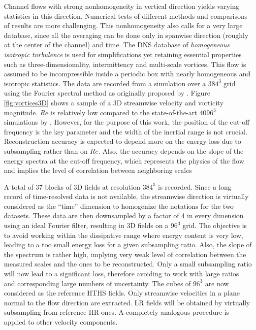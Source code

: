 Channel flows with strong nonhomogeneity in vertical direction yields varying statistics in this direction. Numerical tests of different methods and comparisons of results are more challenging. This nonhomogeneity also calls for a very large database, since all the averaging can be done only in spanwise direction (roughly at the center of the channel) and time. The DNS database of \textit{homogeneous isotropic turbulence} is used for simplifications yet retaining essential properties such as three-dimensionality, intermittency and multi-scale vortices. This flow is assumed to be incompressible inside a periodic box with nearly homogeneous and isotropic statistics. The data are recorded from a simulation over a $ 384^3 $ grid using the Fourier spectral method as originally proposed by \citet{orszag1972numerical}. Figure \ref{fig:vortices3D} shows a sample of a 3D streamwise velocity and vorticity magnitude. $ Re $ is relatively low compared to the state-of-the-art  $ 4096^3 $ simulations by \citep{kaneda2003energy,ishihara2009study}. However, for the purpose of this work, the position of the cut-off frequency is the key parameter and the width of the inertial range is not crucial. Reconstruction accuracy is expected to depend more on the energy loss due to subsampling rather than on $ Re $. Also, the accuracy depends on the slope of the energy spectra at the cut-off frequency, which represents the physics of the flow and implies the level of correlation between neighboring scales

A total of 37 blocks of 3D fields at resolution $ 384^3 $ is recorded. Since a long record of time-resolved data is not available, the streamwise direction is virtually considered as the ``time'' dimension to homogenize the notations for the two datasets. These data are then downsampled by a factor of 4 in every dimension using an ideal Fourier filter, resulting in 3D fields on a $ 96^3 $ grid. The objective is to avoid working within the dissipative range where energy content is very low, leading to a too small energy loss for a given subsampling ratio. Also, the slope of the spectrum is rather high, implying very weak level of correlation between the measured scales and the ones to be reconstructed. Only a small subsampling ratio will now lead to a significant loss, therefore avoiding to work with large ratios and corresponding large numbers of uncertainty. The cubes of $ 96^3 $ are now considered as the reference HTHS fields. Only streamwise velocities in a plane normal to the flow direction are extracted. LR fields will be obtained by virtually subsampling from reference HR ones. A completely analogous procedure is applied to other velocity components.

